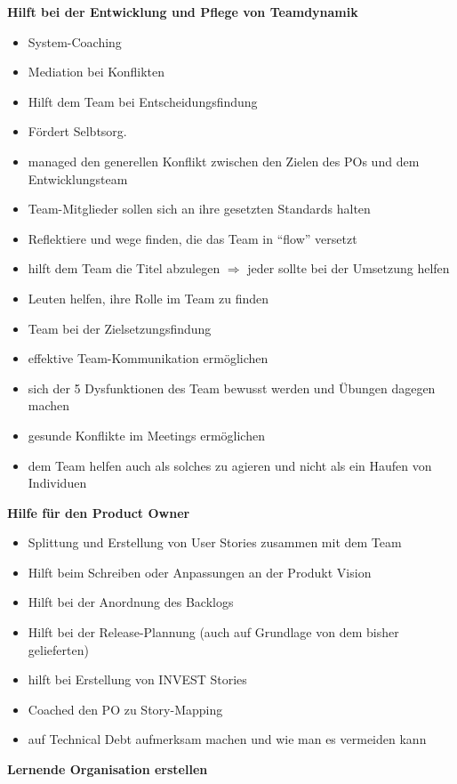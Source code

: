 \textbf{Hilft bei der Entwicklung und Pflege von Teamdynamik}


\begin{itemize}
  \item System-Coaching
  \item Mediation bei Konflikten
  \item Hilft dem Team bei Entscheidungsfindung
  \item Fördert Selbtsorg.
  \item managed den generellen Konflikt zwischen den Zielen des POs und dem Entwicklungsteam
  \item Team-Mitglieder sollen sich an ihre gesetzten Standards halten
  \item Reflektiere und wege finden, die das Team in \enquote{flow} versetzt
  \item hilft dem Team die Titel abzulegen $\Rightarrow$  jeder sollte bei der Umsetzung helfen
  \item Leuten helfen, ihre Rolle im Team zu finden
  \item Team bei der Zielsetzungsfindung
  \item effektive Team-Kommunikation ermöglichen
  \item sich der 5 Dysfunktionen des Team bewusst werden und Übungen dagegen machen
  \item gesunde Konflikte im Meetings ermöglichen
  \item dem Team helfen auch als solches zu agieren und nicht als ein Haufen von Individuen
\end{itemize}


\textbf{Hilfe für den Product Owner}

\begin{itemize}
  \item Splittung und Erstellung von User Stories zusammen mit dem Team
  \item Hilft beim Schreiben oder Anpassungen an der Produkt Vision
  \item Hilft bei der Anordnung des Backlogs
  \item Hilft bei der Release-Plannung (auch auf Grundlage von dem bisher gelieferten)
  \item hilft bei Erstellung von INVEST Stories
  \item Coached den PO zu Story-Mapping
  \item auf Technical Debt aufmerksam machen und wie man es vermeiden kann
\end{itemize}


\textbf{Lernende Organisation erstellen}


